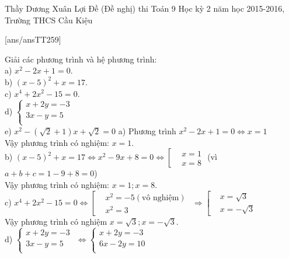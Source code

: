 \begin{name}
{Thầy Dương Xuân Lợi}
{Đề (Đề nghị) thi Toán 9 Học kỳ 2 năm học 2015-2016, Trường THCS Cầu Kiệu }
\end{name}
\setcounter{ex}{0}
[ans/ansTT259]
\begin{ex}%
Giải các phương trình và hệ phương trình:\\
a) $x^2-2x+1=0$.\\
b) ${{\left( x-5 \right)}^{2}}+x=17$.\\
c) $x^4+2x^{2}-15=0$.\\
d) $\begin{cases} x+2y=-3 \\ 3x-y=5 \\ \end{cases}$\\
e) $x^2- \left( \sqrt{2}+1 \right)x+ \sqrt{2}=0$
	\loigiai
	{
		a) Phương trình $x^2-2x+1=0 \Leftrightarrow x=1$\\
		Vậy phương trình có nghiệm: $x=1$.\\
		b) ${{\left( x-5 \right)}^{2}}+x=17 \Leftrightarrow x^2-9x+8=0\Leftrightarrow
		\left[\begin{aligned} & x=1 \\ & x=8\end{aligned}\right.$ (vì $a+b+c=1-9+8=0$)\\
		Vậy phương trình có nghiệm: $x=1; x=8$.\\
		c) $x^4+2x^2-15=0 \Leftrightarrow \left[\begin{aligned} & x^2=-5 (\text{vô nghiệm}) \\ & x^2=3 \end{aligned} \right.$ $\Rightarrow	\left[\begin{aligned} & x= \sqrt{3} \\ & x=-\sqrt{3}\end{aligned}\right.$\\
		Vậy phương trình có nghiệm $x=\sqrt{3};x= -\sqrt{3}$.\\
		d) $\begin{cases} x+2y=-3 \\ 3x-y=5 \\ \end{cases}$
		$\Leftrightarrow \begin{cases} x+2y=-3 \\ 6x-2y=10 \\ \end{cases}$
}
\end{ex}
